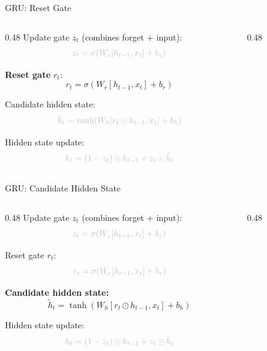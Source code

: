 \begin{frame}{GRU: Reset Gate}
  \begin{columns}[T]
    \begin{column}{0.48\textwidth}
      \textcolor{gray!50}{Update gate $z_t$ (combines forget + input):}
      \[
        \textcolor{gray!50}{z_t = \sigma\!\left(W_z [h_{t-1}, x_t] + b_z\right)}
      \]

      \textbf{Reset gate} $r_t$:
      \[
        r_t = \sigma\!\left(W_r [h_{t-1}, x_t] + b_r\right)
      \]

      \textcolor{gray!50}{Candidate hidden state:}
      \[
        \textcolor{gray!50}{\tilde{h}_t = \tanh\!\left(W_h [r_t \odot h_{t-1}, x_t] + b_h\right)}
      \]

      \textcolor{gray!50}{Hidden state update:}
      \[
        \textcolor{gray!50}{h_t = (1 - z_t) \odot h_{t-1} + z_t \odot \tilde{h}_t}
      \]
    \end{column}
    \begin{column}{0.48\textwidth}
      \begin{center}
      \end{center}
    \end{column}
  \end{columns}
\end{frame}

\begin{frame}{GRU: Candidate Hidden State}
  \begin{columns}[T]
    \begin{column}{0.48\textwidth}
      \textcolor{gray!50}{Update gate $z_t$ (combines forget + input):}
      \[
        \textcolor{gray!50}{z_t = \sigma\!\left(W_z [h_{t-1}, x_t] + b_z\right)}
      \]

      \textcolor{gray!50}{Reset gate $r_t$:}
      \[
        \textcolor{gray!50}{r_t = \sigma\!\left(W_r [h_{t-1}, x_t] + b_r\right)}
      \]

      \textbf{Candidate hidden state:}
      \[
        \tilde{h}_t = \tanh\!\left(W_h [r_t \odot h_{t-1}, x_t] + b_h\right)
      \]

      \textcolor{gray!50}{Hidden state update:}
      \[
        \textcolor{gray!50}{h_t = (1 - z_t) \odot h_{t-1} + z_t \odot \tilde{h}_t}
      \]
    \end{column}
    \begin{column}{0.48\textwidth}
      \begin{center}
      \end{center}
    \end{column}
  \end{columns}
\end{frame}


